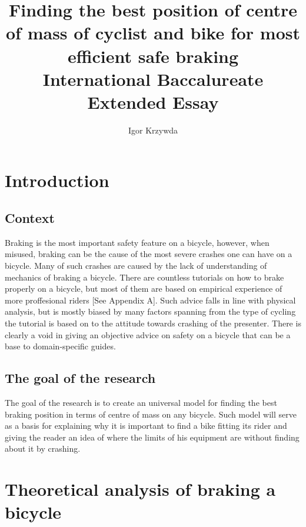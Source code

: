 \documentclass[12pt, a4]{article}
\title{%
Finding the best position of centre of mass of cyclist and bike for most efficient safe braking \\
\large International Baccalureate Extended Essay}
\author{Igor Krzywda}
\begin{document}
\maketitle

\section{Introduction}\label{intro}
\subsection{Context}\label{intro_context}
Braking is the most important safety feature on a bicycle, however, when misused, braking can be the cause of the
most severe crashes one can have on a bicycle. Many of such crashes are caused by the lack of understanding of
mechanics of braking a bicycle. There are countless tutorials on how to brake properly on a bicycle, but most of
them are based on empirical experience of more proffesional riders [See Appendix A]. Such advice falls in line with physical 
analysis, but is mostly biased by many factors spanning from the type of cycling the tutorial is based on to 
the attitude towards crashing of the presenter. There is clearly a void in giving an objective advice on safety 
on a bicycle that can be a base to domain-specific guides.
\subsection{The goal of the research}\label{intro_goal_of_research}
The goal of the research is to create an universal model for finding the best braking position in terms of
centre of mass on any bicycle. Such model will serve as a basis for explaining why it is important to find 
a bike fitting its rider and giving the reader an idea of where the limits of his equipment are without 
finding about it by crashing.

\section{Theoretical analysis of braking a bicycle}\label{theory}
\end{document}

